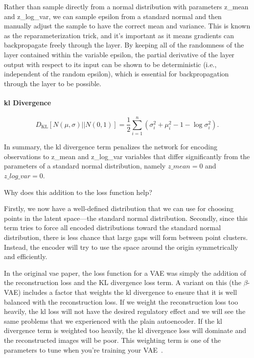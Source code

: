 Rather than sample directly from a normal distribution with parameters z\_mean and z\_log\_var, we can sample epsilon from a standard normal and then manually adjust the sample to have the correct mean and variance.
This is known as the reparameterization trick, and it’s important as it means gradients can backpropagate freely through the layer.
By keeping all of the randomness of the layer contained within the variable epsilon, the partial derivative of the layer output with respect to its input can be shown to be deterministic (i.e., independent of the random epsilon), which is essential for backpropagation through the layer to be possible.

\paragraph{\gls{kl} Divergence}

\[
	D_{\mathrm{KL}}\left[N\left(\mu,\sigma\right)||N\left(0,1\right)\right] = \frac{1}{2} \sum_{i=1}^n \left(\sigma_i^2 + \mu_i^2 - 1 - \log \sigma_i^2\right)
	.\]


In summary, the \gls{kl}  divergence term penalizes the network for encoding observations to  z\_mean and  z\_log\_var  variables that differ significantly from the parameters of a standard normal distribution, namely \( z\_mean = 0 \) and \( z\_log\_var = 0 \).

Why does this addition to the loss function help?

Firstly, we now have a well-defined distribution that we can use for choosing points in the latent space—the standard normal distribution.
Secondly, since this term tries to force all encoded distributions toward the standard normal distribution, there is less chance that large gaps will form between point clusters.
Instead, the encoder will try to use the space around the origin symmetrically and efficiently.

In the original \gls{vae}  paper, the loss function for a VAE was simply the addition of the reconstruction loss and the KL divergence loss term.
A variant on this (the $\beta$-VAE) includes a factor that weights the \gls{kl}  divergence to ensure that it is well balanced with the reconstruction loss.
If we weight the reconstruction loss too heavily, the \gls{kl} loss will not have the desired regulatory effect and we will see the same problems that we experienced with the plain autoencoder.
If the \gls{kl}  divergence term is weighted too heavily, the \gls{kl}  divergence loss will dominate and the reconstructed images will be poor. This weighting term is one of the parameters to tune when you’re training your VAE~\cite{foster2022generative}.

